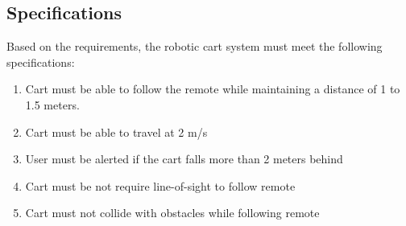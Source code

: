 \documentclass[12pt]{article} %
\begin{document}
\subsection{Specifications}
Based on the requirements, the robotic cart system must meet the following specifications:
\begin{enumerate}
    \item Cart must be able to follow the remote while maintaining a distance of 1 to 1.5 meters.
    \item Cart must be able to travel at 2 m/s
    \item User must be alerted if the cart falls more than 2 meters behind
    \item Cart must be not require line-of-sight to follow remote
    \item Cart must not collide with obstacles while following remote
\end{enumerate}






\end{document}

